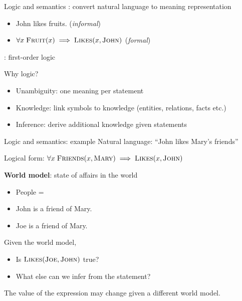 \documentclass[usenames,dvipsnames,notes]{beamer}
\begin{document}
\begin{frame}
    {Logic and semantics}
    : convert natural language to meaning representation\\
    \begin{itemize}
        \item[] John likes fruits. (\emph{informal}) 
        \item[] $\forall x \; \textsc{Fruit}(x) \implies \textsc{Likes}(x, \textsc{John})$ (\emph{formal})
    \end{itemize}

    : first-order logic 

    Why logic?\\
    \begin{itemize}
        \item Unambiguity: one meaning per statement
        \item Knowledge: link symbols to knowledge (entities, relations, facts etc.) 
        \item Inference: derive additional knowledge given statements  
    \end{itemize}
\end{frame}

\begin{frame}
    {Logic and semantics: example}
    Natural language: ``John likes Mary's friends''

    Logical form: $\forall x \;\textsc{Friends}(x, \textsc{Mary}) \implies \textsc{Likes}(x, \textsc{John})$

    \textbf{World model}: state of affairs in the world\\
    \begin{itemize}
        \item[] People = 
        \item[] John is a friend of Mary.
        \item[] Joe is a friend of Mary.
    \end{itemize}

    Given the world model,\\
    \begin{itemize}
        \item Is $\textsc{Likes}(\textsc{Joe}, \textsc{John})$ true?
        \item What else can we infer from the statement? 
    \end{itemize}

    The value of the expression may change given a different world model.
\end{frame}
\end{document}
